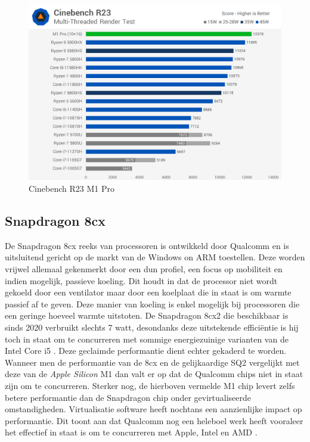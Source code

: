 \begin{figure}[!htb]
    \centering
    \includegraphics[width=\linewidth]{img/m1procinebenchr23.jpg}
    \caption{Cinebench R23 M1 Pro \autocite{Schiesser2021}}
\end{figure}

\subsection{Snapdragon 8cx}
De Snapdragon 8cx reeks van processoren is ontwikkeld door Qualcomm en is uitsluitend gericht op de markt van de Windows on ARM toestellen. Deze worden vrijwel allemaal gekenmerkt door een dun profiel, een focus op mobiliteit en indien mogelijk, passieve koeling. Dit houdt in dat de processor niet wordt gekoeld door een ventilator maar door een koelplaat die in staat is om warmte passief af te geven. Deze manier van koeling is enkel mogelijk bij processoren die een geringe hoeveel warmte uitstoten. De Snapdragon 8cx2 die beschikbaar is sinds 2020 verbruikt slechts 7 watt, desondanks deze uitstekende efficiëntie is hij toch in staat om te concurreren met sommige energiezuinige varianten van de Intel Core i5 \autocite{Qualcomm2020}. Deze geclaimde performantie dient echter gekaderd te worden. Wanneer men de performantie van de 8cx en de gelijkaardige SQ2 vergelijkt met deze van de \textit{Apple Silicon} M1 dan valt er op dat de Qualcomm chips niet in staat zijn om te concurreren. Sterker nog, de hierboven vermelde M1 chip levert zelfs betere performantie dan de Snapdragon chip onder gevirtualiseerde omstandigheden. Virtualisatie software heeft nochtans een aanzienlijke impact op performantie. Dit toont aan dat Qualcomm nog een heleboel werk heeft vooraleer het effectief in staat is om te concurreren met Apple, Intel en AMD \autocite{Wankhede2020}.

